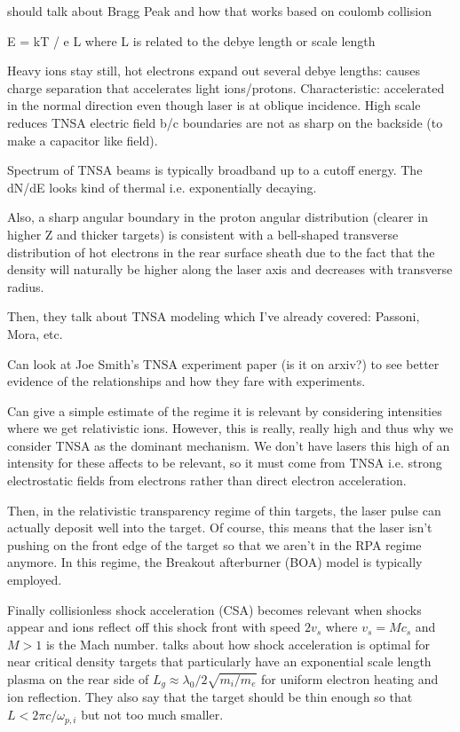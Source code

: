 should talk about Bragg Peak and how that works based on coulomb collision

E = kT / e L where L is related to the debye length or scale length

Heavy ions stay still, hot electrons expand out several debye lengths: causes charge separation that accelerates light ions/protons. Characteristic: accelerated in the normal direction even though laser is at oblique incidence. High scale reduces TNSA electric field b/c boundaries are not as sharp on the backside (to make a capacitor like field). 

Spectrum of TNSA beams is typically broadband up to a cutoff energy. The dN/dE looks kind of thermal i.e. exponentially decaying.  

Also, a sharp angular boundary in the proton angular distribution (clearer in higher Z and thicker targets) is consistent with a bell-shaped transverse distribution of hot electrons in the rear surface sheath due to the fact that the density will naturally be higher along the laser axis and decreases with transverse radius. 

Then, they talk about TNSA modeling which I've already covered: Passoni, Mora, etc.

Can look at Joe Smith's TNSA experiment paper (is it on arxiv?) to see better evidence of the relationships and how they fare with experiments.

Can give a simple estimate of the regime it is relevant by considering intensities where we get relativistic ions. However, this is really, really high and thus why we consider TNSA as the dominant mechanism. We don't have lasers this high of an intensity for these affects to be relevant, so it must come from TNSA i.e. strong electrostatic fields from electrons rather than direct electron acceleration.

Then, in the relativistic transparency regime of thin targets, the laser pulse can actually deposit well into the target. Of course, this means that the laser isn't pushing on the front edge of the target so that we aren't in the RPA regime anymore. In this regime, the Breakout afterburner (BOA) model is typically employed. 

Finally collisionless shock acceleration (CSA) becomes relevant when shocks appear and ions reflect off this shock front with speed $2 v_s$ where $v_s = M c_s$ and $M > 1$ is the Mach number. \citep{Fiuza_2013_PoP} talks about how shock acceleration is optimal for near critical density targets that particularly have an exponential scale length plasma on the rear side of $L_g \approx \lambda_0 / 2 \sqrt{m_i/m_e}$ for uniform electron heating and ion reflection. They also say that the target should be thin enough so that $L < 2 \pi c / \omega_{p,i}$ but not too much smaller. 
